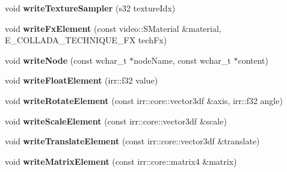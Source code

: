 \begin{DoxyCompactItemize}
\item 
\hypertarget{classirr_1_1scene_1_1_c_collada_mesh_writer_aaafb7bbb1a24da31c37f8bf20a35db59}{void {\bfseries write\-Texture\-Sampler} (s32 texture\-Idx)}\label{classirr_1_1scene_1_1_c_collada_mesh_writer_aaafb7bbb1a24da31c37f8bf20a35db59}

\item 
\hypertarget{classirr_1_1scene_1_1_c_collada_mesh_writer_a640e62c7c378bf8437a9197983dd86e6}{void {\bfseries write\-Fx\-Element} (const video\-::\-S\-Material \&material, E\-\_\-\-C\-O\-L\-L\-A\-D\-A\-\_\-\-T\-E\-C\-H\-N\-I\-Q\-U\-E\-\_\-\-F\-X tech\-Fx)}\label{classirr_1_1scene_1_1_c_collada_mesh_writer_a640e62c7c378bf8437a9197983dd86e6}

\item 
\hypertarget{classirr_1_1scene_1_1_c_collada_mesh_writer_a621a1606210ec06fac35970487f861a5}{void {\bfseries write\-Node} (const wchar\-\_\-t $\ast$node\-Name, const wchar\-\_\-t $\ast$content)}\label{classirr_1_1scene_1_1_c_collada_mesh_writer_a621a1606210ec06fac35970487f861a5}

\item 
\hypertarget{classirr_1_1scene_1_1_c_collada_mesh_writer_a9deb1b69a02a846ac02bf4c6449b922a}{void {\bfseries write\-Float\-Element} (irr\-::f32 value)}\label{classirr_1_1scene_1_1_c_collada_mesh_writer_a9deb1b69a02a846ac02bf4c6449b922a}

\item 
\hypertarget{classirr_1_1scene_1_1_c_collada_mesh_writer_aa370cecb6bb69e28f3d928138a2f218e}{void {\bfseries write\-Rotate\-Element} (const irr\-::core\-::vector3df \&axis, irr\-::f32 angle)}\label{classirr_1_1scene_1_1_c_collada_mesh_writer_aa370cecb6bb69e28f3d928138a2f218e}

\item 
\hypertarget{classirr_1_1scene_1_1_c_collada_mesh_writer_a9bea138c842a2ff0f01389a0df60fe2c}{void {\bfseries write\-Scale\-Element} (const irr\-::core\-::vector3df \&scale)}\label{classirr_1_1scene_1_1_c_collada_mesh_writer_a9bea138c842a2ff0f01389a0df60fe2c}

\item 
\hypertarget{classirr_1_1scene_1_1_c_collada_mesh_writer_a7ebce96d6bd8d588e27081359b04534f}{void {\bfseries write\-Translate\-Element} (const irr\-::core\-::vector3df \&translate)}\label{classirr_1_1scene_1_1_c_collada_mesh_writer_a7ebce96d6bd8d588e27081359b04534f}

\item 
\hypertarget{classirr_1_1scene_1_1_c_collada_mesh_writer_a1084e80167726204de275ebb8bbae557}{void {\bfseries write\-Matrix\-Element} (const irr\-::core\-::matrix4 \&matrix)}\label{classirr_1_1scene_1_1_c_collada_mesh_writer_a1084e80167726204de275ebb8bbae557}

\end{DoxyCompactItemize}
